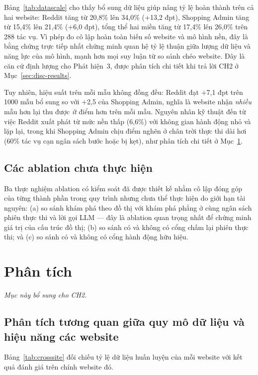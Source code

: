 Bảng~\ref{tab:datascale} cho thấy bổ sung dữ liệu giúp nâng tỷ lệ hoàn thành trên cả hai website: Reddit tăng từ 20{,}8\% lên 34{,}0\% ($+$13{,}2 đpt), Shopping Admin tăng từ 15{,}4\% lên 21{,}4\% ($+$6{,}0 đpt), tổng thể hai miền tăng từ 17{,}4\% lên 26{,}0\% trên 288 tác vụ. Vì phép đo cô lập hoàn toàn biến số website và mô hình nền, đây là bằng chứng trực tiếp nhất chứng minh quan hệ tỷ lệ thuận giữa lượng dữ liệu và năng lực của mô hình, mạnh hơn mọi suy luận từ so sánh chéo website. Đây là căn cứ định lượng cho Phát hiện~3, được phân tích chi tiết khi trả lời CH2 ở Mục~\ref{sec:disc-results}.

Tuy nhiên, hiệu suất trên mỗi mẫu không đồng đều: Reddit đạt $+$7{,}1 đpt trên 1000 mẫu bổ sung so với $+$2{,}5 của Shopping Admin, nghĩa là website nhận \emph{nhiều} mẫu hơn lại thu được \emph{ít} điểm hơn trên mỗi mẫu. Nguyên nhân kỹ thuật đến từ việc Reddit xuất phát từ mức nền thấp (6{,}6\%) với không gian hành động nhỏ và lặp lại, trong khi Shopping Admin chịu điểm nghẽn ở chân trời thực thi dài hơi (60\% tác vụ cạn ngân sách bước hoặc bị kẹt), như phân tích chi tiết ở Mục~\ref{sec:exp-analysis}.

\subsection{Các ablation chưa thực hiện}
Ba thực nghiệm ablation có kiểm soát đã được thiết kế nhằm cô lập đóng góp của từng thành phần trong quy trình nhưng chưa thể thực hiện do giới hạn tài nguyên: (a) so sánh khám phá theo đồ thị với khám phá phẳng ở cùng ngân sách phiên thực thi và lời gọi LLM — đây là ablation quan trọng nhất để chứng minh giá trị của cấu trúc đồ thị; (b) so sánh có và không có cổng chấm lại phiên thực thi; và (c) so sánh có và không có cổng hành động hữu hiệu.

\section{Phân tích}
\label{sec:exp-analysis}

\noindent\emph{Mục này bổ sung cho CH2.}

\subsection{Phân tích tương quan giữa quy mô dữ liệu và hiệu năng các website}
\label{sec:exp-crosssite}

Bảng~\ref{tab:crosssite} đối chiếu tỷ lệ dữ liệu huấn luyện của mỗi website với kết quả đánh giá trên chính website đó.

